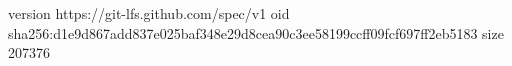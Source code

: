 version https://git-lfs.github.com/spec/v1
oid sha256:d1e9d867add837e025baf348e29d8cea90c3ee58199ccff09fcf697ff2eb5183
size 207376
